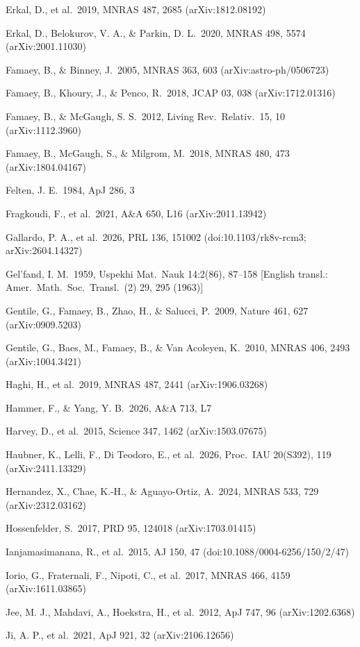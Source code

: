 \documentclass[
  10pt,
]{article}
\begin{document}
{\begin{list}{}{\setlength{\leftmargin}{1.5em}\setlength{\itemindent}{-1.5em}\setlength{\itemsep}{1pt}\setlength{\parsep}{0pt}}
\item Erkal, D., et al.\ 2019, MNRAS 487, 2685 (arXiv:1812.08192)
\item Erkal, D., Belokurov, V. A., \& Parkin, D. L.\ 2020, MNRAS 498, 5574 (arXiv:2001.11030)
\item Famaey, B., \& Binney, J.\ 2005, MNRAS 363, 603 (arXiv:astro-ph/0506723)
\item Famaey, B., Khoury, J., \& Penco, R.\ 2018, JCAP 03, 038 (arXiv:1712.01316)
\item Famaey, B., \& McGaugh, S. S.\ 2012, Living Rev.\ Relativ.\ 15, 10 (arXiv:1112.3960)
\item Famaey, B., McGaugh, S., \& Milgrom, M.\ 2018, MNRAS 480, 473 (arXiv:1804.04167)
\item Felten, J. E.\ 1984, ApJ 286, 3
\item Fragkoudi, F., et al.\ 2021, A\&A 650, L16 (arXiv:2011.13942)
\item Gallardo, P. A., et al.\ 2026, PRL 136, 151002 (doi:10.1103/rk8v-rcm3; arXiv:2604.14327)
\item Gel'fand, I. M.\ 1959, Uspekhi Mat.\ Nauk 14:2(86), 87--158 [English transl.: Amer.\ Math.\ Soc.\ Transl.\ (2) 29, 295 (1963)]
\item Gentile, G., Famaey, B., Zhao, H., \& Salucci, P.\ 2009, Nature 461, 627 (arXiv:0909.5203)
\item Gentile, G., Baes, M., Famaey, B., \& Van Acoleyen, K.\ 2010, MNRAS 406, 2493 (arXiv:1004.3421)
\item Haghi, H., et al.\ 2019, MNRAS 487, 2441 (arXiv:1906.03268)
\item Hammer, F., \& Yang, Y. B.\ 2026, A\&A 713, L7
\item Harvey, D., et al.\ 2015, Science 347, 1462 (arXiv:1503.07675)
\item Haubner, K., Lelli, F., Di Teodoro, E., et al.\ 2026, Proc.\ IAU 20(S392), 119 (arXiv:2411.13329)
\item Hernandez, X., Chae, K.-H., \& Aguayo-Ortiz, A.\ 2024, MNRAS 533, 729 (arXiv:2312.03162)
\item Hossenfelder, S.\ 2017, PRD 95, 124018 (arXiv:1703.01415)
\item Ianjamasimanana, R., et al.\ 2015, AJ 150, 47 (doi:10.1088/0004-6256/150/2/47)
\item Iorio, G., Fraternali, F., Nipoti, C., et al.\ 2017, MNRAS 466, 4159 (arXiv:1611.03865)
\item Jee, M. J., Mahdavi, A., Hoekstra, H., et al.\ 2012, ApJ 747, 96 (arXiv:1202.6368)
\item Ji, A. P., et al.\ 2021, ApJ 921, 32 (arXiv:2106.12656)

\end{list}}
\end{document}
